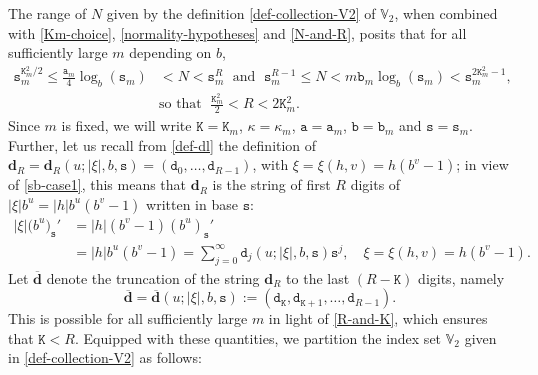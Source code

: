 \documentclass[12pt, twoside]{article}
\theoremstyle{definition}
\numberwithin{equation}{section}
\begin{document}
The range of $N$ given by the definition \eqref{def-collection-V2} of $\mathbb V_2$, when combined with \eqref{Km-choice},  \eqref{normality-hypotheses} and \eqref{N-and-R}, posits that for all sufficiently large $m$ depending on $b$, 
\begin{align}
\mathtt s_m^{\mathtt K_m^2/2} \leq \frac{\mathtt a_m}{4} \log_{b} (\mathtt s_m) &< N < \mathtt s_m^R \; \text{ and } \; \mathtt s_m^{R-1} \leq N < m\mathtt b_m \log_b(\mathtt s_m) < \mathtt s_m^{2\mathtt K_m^2-1}, \nonumber \\ &\text{so that } \; \frac{\mathtt K_m^2}{2} < R < 2\mathtt K_m^2. \label{R-and-K}
\end{align} 
Since $m$ is fixed, we will write $\mathtt K = \mathtt K_m$,  $\kappa = \kappa_m$, $\mathtt a = \mathtt a_m$, $\mathtt b = \mathtt b_m$ and $\mathtt s = \mathtt s_m$. Further, let us recall from \eqref{def-dl} the definition of $\mathbf d_{R} = \mathbf d_R(u; {|\xi|,} b, \mathtt s) = (\mathtt d_0, \ldots, \mathtt d_{R-1})$, with $\xi = \xi(h, v) = { h } (b^v-1)$; in view of \eqref{sb-case1}, this means that $\mathbf d_{R}$ is the string of first $R$ digits of $|\xi| b^{u} = |h|b^u (b^v-1)$ written in base $\mathtt s$:   
\begin{align} 
{|\xi|} \bigl(b^u\bigr)_{\mathtt s}' &=  |h|(b^v-1) (b^u)_{\mathtt s}' \nonumber \\ &= |h|b^u(b^v-1) = \sum_{j=0}^{\infty} \mathtt d_j(u; { |\xi|}, b, \mathtt s) \mathtt s^j, \quad  \xi = \xi(h, v) =  { h} (b^v-1). \label{what-is-xi}
\end{align} 
Let $\overline{\mathbf d}$ denote the truncation of the string $\mathbf d_{R}$ to the last $(R-\mathtt K)$ digits, namely \begin{equation} 
\overline{\mathbf d} = \overline{\mathbf d}(u; {|\xi|}, b, \mathtt s) :=  (\mathtt d_{\mathtt K}, \mathtt d_{\mathtt K+1}, \ldots, \mathtt d_{R-1}). \label{what-is-d-bar}
\end{equation} 
This is possible for all sufficiently large $m$ in light of \eqref{R-and-K}, which ensures that $\mathtt K < R$.  
\vskip0.1in
\noindent Equipped with these quantities, we partition the index set $\mathbb V_2$ given in \eqref{def-collection-V2} as follows:   
\end{document}
